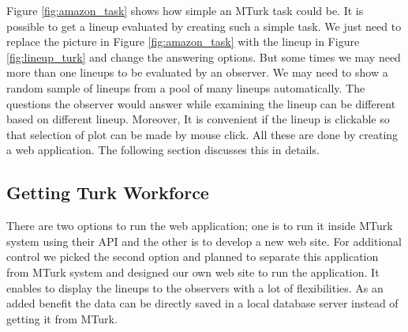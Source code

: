 \documentclass[11pt]{article}
\begin{document}
Figure \ref{fig:amazon_task} shows how simple an MTurk task could be. It is possible to get a lineup evaluated by creating such a simple task. We just need to replace the picture in Figure \ref{fig:amazon_task} with the lineup in Figure \ref{fig:lineup_turk} and change the answering options. But some times we may need more than one lineups to be evaluated by an observer. We may need to show a random sample of lineups from a pool of many lineups automatically. The questions the observer would answer while examining the lineup can be different based on different lineup. Moreover, It is convenient if the lineup is clickable so that selection of plot can be made by mouse click. All these are done by creating a web application. The following section discusses this in details.





\subsection{Getting Turk Workforce}

There are two options to run the web application; one is to run it inside MTurk system using their API and the other is to develop a new web site. For additional control we picked the second option and planned to separate this application from MTurk system and designed our own web site to run the application. It enables to display the lineups to the observers with a lot of flexibilities. As an added benefit the data can be directly saved in a local database server instead of getting it from MTurk. 
\end{document}
